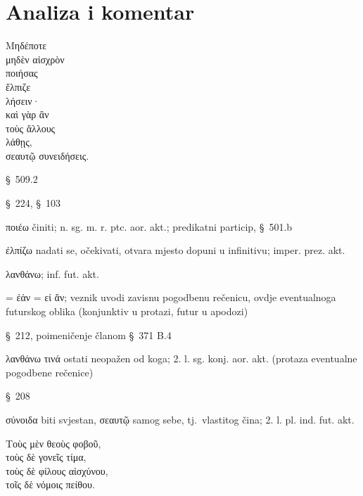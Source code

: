 \section*{Analiza i komentar}


{\large
\noindent Μηδέποτε \\
\tabto{2em} μηδὲν αἰσχρὸν \\
\tabto{2em} ποιήσας \\
ἔλπιζε \\
\tabto{2em} λήσειν·\\
καὶ γὰρ ἂν \\
\tabto{2em} τοὺς ἄλλους \\
\tabto{2em} λάθῃς, \\
σεαυτῷ συνειδήσεις.\\

}

\begin{description}[noitemsep]

\item[Μηδέποτε] §~509.2
\item[μηδὲν αἰσχρὸν] §~224, §~103
\item[ποιήσας] ποιέω činiti; n. sg. m. r. ptc. aor. akt.; predikatni particip, §~501.b
\item[ἔλπιζε] ἐλπίζω nadati se, očekivati, otvara mjesto dopuni u infinitivu; imper. prez. akt.
\item[λήσειν] λανθάνω; inf. fut. akt.
\item[ἂν] = ἐάν = εἰ ἄν; veznik uvodi zavisnu pogodbenu rečenicu, ovdje eventualnoga futurskog oblika (konjunktiv u protazi, futur u apodozi)
\item[τοὺς ἄλλους] §~212, poimeničenje članom §~371 B.4
\item[λάθῃς] λανθάνω τινά ostati neopažen od koga; 2. l. sg. konj. aor. akt. (protaza eventualne pogodbene rečenice)
\item[σεαυτῷ] §~208
\item[συνειδήσεις] σύνοιδα biti svjestan, σεαυτῷ samog sebe, tj.\ vlastitog čina; 2. l. pl. ind. fut. akt.
\end{description}

{\large
\noindent Τοὺς μὲν θεοὺς φοβοῦ, \\
τοὺς δὲ γονεῖς τίμα, \\
τοὺς δὲ φίλους αἰσχύνου, \\
τοῖς δὲ νόμοις πείθου.\\

}

